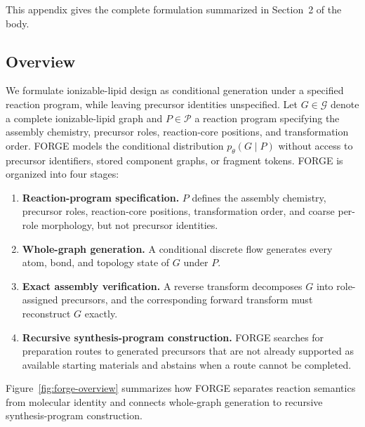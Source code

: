 \documentclass{article}
\begin{document}
This appendix gives the complete formulation summarized in Section~2 of the body.

\subsection{Overview}

We formulate ionizable-lipid design as conditional generation under a specified reaction program,
while leaving precursor identities unspecified.
Let $G\in\mathcal{G}$ denote a complete ionizable-lipid graph and $P\in\mathcal{P}$ a reaction
program specifying the assembly chemistry, precursor roles, reaction-core positions, and
transformation order.
FORGE models the conditional distribution $p_\theta(G\mid P)$ without access to precursor
identifiers, stored component graphs, or fragment tokens.
FORGE is organized into four stages:
\begin{enumerate}
    \item \textbf{Reaction-program specification.}
    $P$ defines the assembly chemistry, precursor roles, reaction-core positions, transformation
    order, and coarse per-role morphology, but not precursor identities.

    \item \textbf{Whole-graph generation.}
    A conditional discrete flow generates every atom, bond, and topology state of $G$ under $P$.

    \item \textbf{Exact assembly verification.}
    A reverse transform decomposes $G$ into role-assigned precursors, and the corresponding forward
    transform must reconstruct $G$ exactly.

    \item \textbf{Recursive synthesis-program construction.}
    FORGE searches for preparation routes to generated precursors that are not already supported as
    available starting materials and abstains when a route cannot be completed.
\end{enumerate}

Figure~\ref{fig:forge-overview} summarizes how FORGE separates reaction semantics from molecular
identity and connects whole-graph generation to recursive synthesis-program construction.
\end{document}
